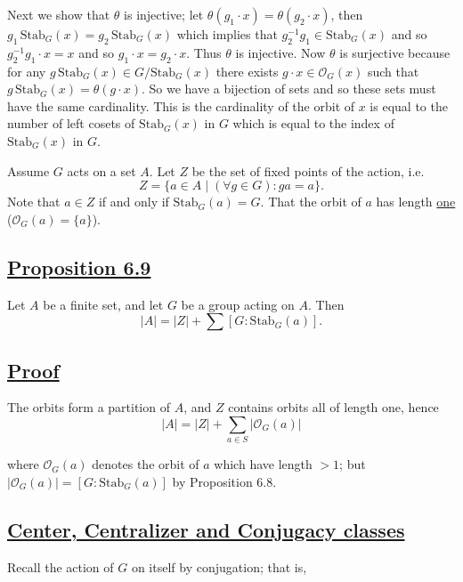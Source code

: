 Next we show that $\theta$ is injective; let $\theta(g_1 \cdot x) = \theta(g_2 \cdot x)$, then $g_1 \, \text{Stab}_G(x) = g_2 \, \text{Stab}_G(x)$ which implies that $g_2^{-1} g_1 \in \text{Stab}_G(x)$ and so $g_2^{-1} g_1 \cdot x = x$ and so $g_1 \cdot x = g_2 \cdot x$. Thus $\theta$ is injective. Now $\theta$ is surjective because for any $g \, \text{Stab}_G(x) \in G/\text{Stab}_G(x)$
there exists $g \cdot x \in \mathcal{O}_G(x)$ such that $g \, \text{Stab}_G(x) = \theta(g \cdot x)$. So we have a bijection of sets and so these sets must have the same cardinality. This is the cardinality of the orbit of $x$ is equal to the number of left cosets of $\text{Stab}_G(x)$ in $G$ which is equal to the index of $\text{Stab}_G(x)$ in $G$.

\vspace{2em}

Assume $G$ acts on a set $A$. Let $Z$ be the set of fixed points of the action, i.e.
\[
Z = \{a \in A \mid (\forall g \in G) : ga = a\}.
\]
Note that $a \in Z$ if and only if $\text{Stab}_G(a) = G$. That the orbit of \underline{$a$} has length \underline{one} ({\color{blue}$\mathcal{O}_G(a) = \{a\}$}).

\vspace{1.5em}

\subsection*{\underline{\color{blue}Proposition 6.9}}
Let $A$ be a finite set, and let $G$ be a group acting on $A$. Then
\[
|A| = |Z| + \sum [G : \text{Stab}_G(a)].
\]

\vspace{1em}

\subsection*{\underline{Proof}}
The orbits form a partition of $A$, and $Z$ contains orbits all of length one, hence
\[
|A| = |Z| + \sum_{a \in S} |\mathcal{O}_G(a)|
\]

where $\mathcal{O}_G(a)$ denotes the orbit of $a$ which have length $>1$; but $|\mathcal{O}_G(a)| = [G : \text{Stab}_G(a)]$ by Proposition 6.8.

\vspace{1.5em}

\subsection*{\underline{Center, Centralizer and Conjugacy classes}}
Recall the action of $G$ on itself by conjugation; that is,


